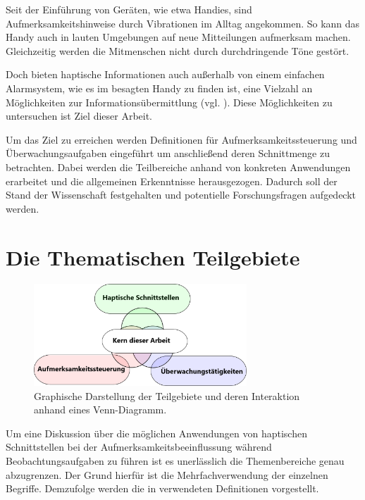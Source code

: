 \documentclass{llncs}					%
\begin{document}
Seit der Einführung von Geräten, wie etwa Handies, sind Aufmerksamkeitshinweise durch Vibrationen im Alltag angekommen. So kann das Handy auch in lauten Umgebungen auf neue Mitteilungen aufmerksam machen. Gleichzeitig werden die Mitmenschen nicht durch durchdringende Töne gestört.

Doch bieten haptische Informationen auch außerhalb von einem einfachen Alarmsystem, wie es im besagten Handy zu finden ist, eine Vielzahl an Möglichkeiten zur Informationsübermittlung (vgl. \cite{10.2307/1705360}). Diese Möglichkeiten zu untersuchen ist Ziel dieser Arbeit.

Um das Ziel zu erreichen werden Definitionen für Aufmerksamkeitssteuerung und Überwachungsaufgaben eingeführt um anschließend deren Schnittmenge zu betrachten. Dabei werden die Teilbereiche anhand von konkreten Anwendungen erarbeitet und die allgemeinen Erkenntnisse herausgezogen.
Dadurch soll der Stand der Wissenschaft festgehalten und potentielle Forschungsfragen aufgedeckt werden.

\section{Die Thematischen Teilgebiete}

\begin{figure}[htbp]
	\begin{center}
		\includegraphics[width = 8cm]{Grafiken/Venn-Diagramm.png}
		\caption{Graphische Darstellung der Teilgebiete und deren Interaktion anhand eines Venn-Diagramm.}
		\label{Venn-Diagramm.png}
	\end{center}
\end{figure}

Um eine Diskussion über die möglichen Anwendungen von haptischen Schnittstellen bei der Aufmerksamkeitsbeeinflussung während Beobachtungsaufgaben zu führen ist es unerlässlich die Themenbereiche genau abzugrenzen. Der Grund hierfür ist die Mehrfachverwendung der einzelnen Begriffe. Demzufolge werden die in verwendeten Definitionen vorgestellt.
\end{document}
